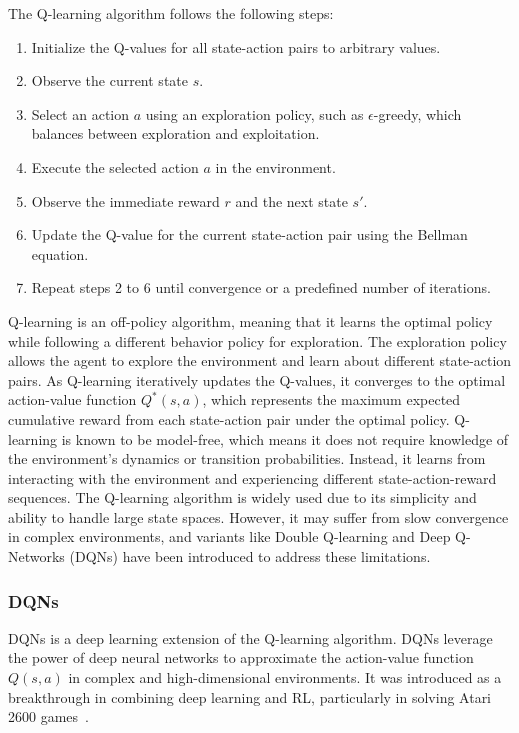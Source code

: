 The Q-learning algorithm follows the following steps:
\begin{enumerate}
    \item Initialize the Q-values for all state-action pairs to arbitrary values.
    \item Observe the current state \(s\).
    \item Select an action \(a\) using an exploration policy, such as \(\epsilon\)-greedy, which balances between exploration and exploitation.
    \item Execute the selected action \(a\) in the environment.
    \item Observe the immediate reward \(r\) and the next state \(s'\).
    \item Update the Q-value for the current state-action pair using the Bellman equation.
    \item Repeat steps 2 to 6 until convergence or a predefined number of iterations.
\end{enumerate}
Q-learning is an off-policy algorithm, meaning that it learns the optimal policy while following a different behavior policy for exploration. The exploration policy allows the agent to explore the environment and learn about different state-action pairs.
As Q-learning iteratively updates the Q-values, it converges to the optimal action-value function \(Q^*(s, a)\), which represents the maximum expected cumulative reward from each state-action pair under the optimal policy.
Q-learning is known to be model-free, which means it does not require knowledge of the environment's dynamics or transition probabilities. Instead, it learns from interacting with the environment and experiencing different state-action-reward sequences.
The Q-learning algorithm is widely used due to its simplicity and ability to handle large state spaces. However, it may suffer from slow convergence in complex environments, and variants like Double Q-learning and Deep Q-Networks (DQNs) have been introduced to address these limitations.

\subsubsection{DQNs}
DQNs is a deep learning extension of the Q-learning algorithm. DQNs leverage the power of deep neural networks to approximate the action-value function \(Q(s, a)\) in complex and high-dimensional environments. It was introduced as a breakthrough in combining deep learning and RL, particularly in solving Atari 2600 games~\cite{Mnih2013}.

